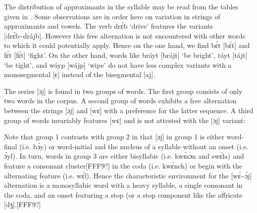 The distribution of approximants in the syllable may be read from the tables given in . Some observations are in order here on variation in strings of approximants and vowels. The verb drɛ́b ‘drive’ features the variants [drɛ́b{\textasciitilde}drájb]. However this free alternation is not encountered with other words to which it could potentially apply. Hence on the one hand, we find bɛ́t [bɛ́t] and fɛ́t [fɛ́t] ‘fight’. On the other hand, words like bráyt [brájt] ‘be bright’, táyt [tájt] ‘be tight’, and wáyp [wájp] ‘wipe’ do not have less complex variants with a monosegmental [ɛ] instead of the bisegmental [aj]. 



The series [ɔj] is found in two groups of words. The first group consists of only two words in the corpus. A second group of words exhibits a free alternation between the strings [ɔj] and [wɛ] with a preference for the latter sequence. A third group of words invariably features [wɛ] and is not attested with the [ɔj] variant:

Note that group 1 contrasts with group 2 in that [ɔj] in group 1 is either word-final (i.e. bɔ́y) or word-initial and the nucleus of a syllable without an onset (i.e. ɔ́yl). In turn, words in group 3 are either bisyllabic (i.e. kwɛ́sɔn and swɛ́la) and feature a consonant cluster[FFF9?] in the coda (i.e. kwɛ́nch) or begin with the alternating feature (i.e. wɛ́l). Hence the characteristic environment for the [wɛ́{\textasciitilde}ɔ́j] alternation is a monosyllabic word with a heavy syllable, a single consonant in the coda, and an onset featuring a stop (or a stop component like the affricate [dʒ].[FFF9?] 

